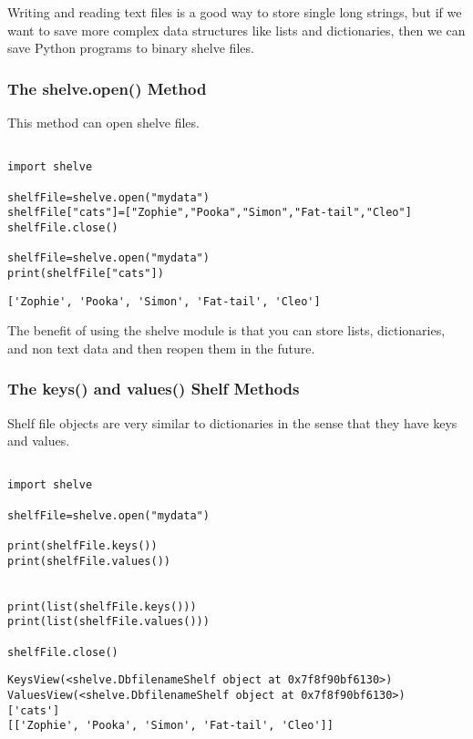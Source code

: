 \documentclass[11pt]{article}
\begin{document}
Writing and reading text files is a good way to store single long strings, but if we want to save more complex data structures like lists and dictionaries, then we can save Python programs to binary shelve files.

\subsubsection{The shelve.open() Method}
\label{sec:orgb305821}

This method can open shelve files.

\begin{verbatim}

import shelve

shelfFile=shelve.open("mydata")
shelfFile["cats"]=["Zophie","Pooka","Simon","Fat-tail","Cleo"]
shelfFile.close()

shelfFile=shelve.open("mydata")
print(shelfFile["cats"])

\end{verbatim}

\begin{verbatim}
['Zophie', 'Pooka', 'Simon', 'Fat-tail', 'Cleo']
\end{verbatim}


The benefit of using the shelve module is that you can store lists, dictionaries, and non text data and then reopen them in the future.

\subsubsection{The keys() and values() Shelf Methods}
\label{sec:org5efff89}

Shelf file objects are very similar to dictionaries in the sense that they have keys and values.

\begin{verbatim}

import shelve

shelfFile=shelve.open("mydata")

print(shelfFile.keys())
print(shelfFile.values())


print(list(shelfFile.keys()))
print(list(shelfFile.values()))

shelfFile.close()
\end{verbatim}

\begin{verbatim}
KeysView(<shelve.DbfilenameShelf object at 0x7f8f90bf6130>)
ValuesView(<shelve.DbfilenameShelf object at 0x7f8f90bf6130>)
['cats']
[['Zophie', 'Pooka', 'Simon', 'Fat-tail', 'Cleo']]
\end{verbatim}
\end{document}
